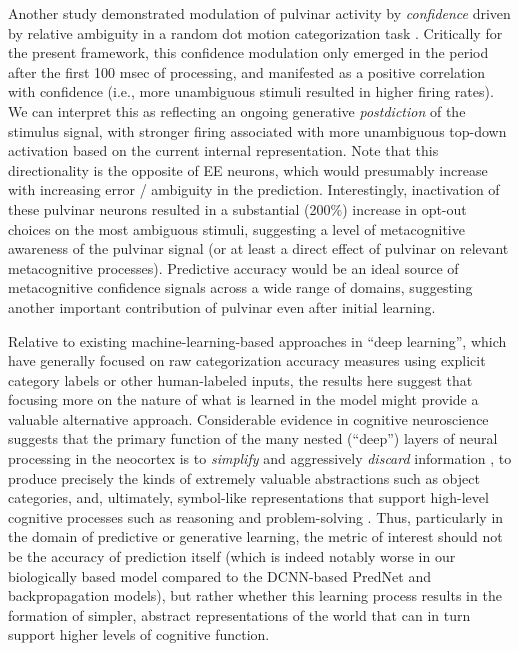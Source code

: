\documentclass[11pt,twoside]{article}
\newif\myifpdf
\begin{document}
Another study demonstrated modulation of pulvinar activity by \emph{confidence} driven by relative ambiguity in a random dot motion categorization task \citep{KomuraNikkuniHirashimaEtAl13}.  Critically for the present framework, this confidence modulation only emerged in the period after the first 100 msec of processing, and manifested as a positive correlation with confidence (i.e., more unambiguous stimuli resulted in higher firing rates).  We can interpret this as reflecting an ongoing generative \emph{postdiction} of the stimulus signal, with stronger firing associated with more unambiguous top-down activation based on the current internal representation.  Note that this directionality is the opposite of EE neurons, which would presumably increase with increasing error / ambiguity in the prediction.  Interestingly, inactivation of these pulvinar neurons resulted in a substantial (200\%) increase in opt-out choices on the most ambiguous stimuli, suggesting a level of metacognitive awareness of the pulvinar signal (or at least a direct effect of pulvinar on relevant metacognitive processes).  Predictive accuracy would be an ideal source of metacognitive confidence signals across a wide range of domains, suggesting another important contribution of pulvinar even after initial learning.



 Relative to existing machine-learning-based approaches in ``deep learning'', which have generally focused on raw categorization accuracy measures using explicit category labels or other human-labeled inputs, the results here suggest that focusing more on the nature of what is learned in the model might provide a valuable alternative approach.  Considerable evidence in cognitive neuroscience suggests that the primary function of the many nested (``deep'') layers of neural processing in the neocortex is to \emph{simplify} and aggressively \emph{discard} information \citep{SimonsRensink05}, to produce precisely the kinds of extremely valuable abstractions such as object categories, and, ultimately, symbol-like representations that support high-level cognitive processes such as reasoning and problem-solving \citep{RougierNoelleBraverEtAl05,OReillyPetrovCohenEtAl14}.  Thus, particularly in the domain of predictive or generative learning, the metric of interest should not be the accuracy of prediction itself (which is indeed notably worse in our biologically based model compared to the DCNN-based PredNet and backpropagation models), but rather whether this learning process results in the formation of simpler, abstract representations of the world that can in turn support higher levels of cognitive function.
\end{document}
